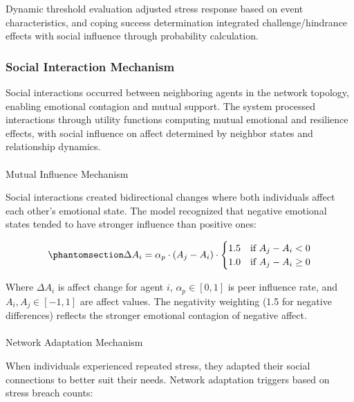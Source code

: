 \documentclass[
  letterpaper,
  DIV=11,
  numbers=noendperiod]{scrartcl}
\makeatletter
\let\oldparagraph\paragraph
\renewcommand{\paragraph}{
    \@ifstar
      \xxxParagraphStar
      \xxxParagraphNoStar
  }
\newcommand{\xxxParagraphStar}[1]{\oldparagraph*{#1}\mbox{}}
\newcommand{\xxxParagraphNoStar}[1]{\oldparagraph{#1}\mbox{}}
\makeatother
\begin{document}
Dynamic threshold evaluation adjusted stress response based on event
characteristics, and coping success determination integrated
challenge/hindrance effects with social influence through probability
calculation.

\subsubsection{Social Interaction
Mechanism}\label{social-interaction-mechanism}

Social interactions occurred between neighboring agents in the network
topology, enabling emotional contagion and mutual support. The system
processed interactions through utility functions computing mutual
emotional and resilience effects, with social influence on affect
determined by neighbor states and relationship dynamics.

\paragraph{Mutual Influence Mechanism}\label{mutual-influence-mechanism}

Social interactions created bidirectional changes where both individuals
affect each other's emotional state. The model recognized that negative
emotional states tended to have stronger influence than positive ones:

\begin{equation}\phantomsection\label{eq-mutual-influence}{
\Delta A_i = \alpha_p \cdot (A_j - A_i) \cdot \begin{cases}
1.5 & \text{if } A_j - A_i < 0 \\
1.0 & \text{if } A_j - A_i \geq 0
\end{cases}
}\end{equation}

Where \(\Delta A_i\) is affect change for agent \(i\),
\(\alpha_p \in [0,1]\) is peer influence rate, and
\(A_i, A_j \in [-1,1]\) are affect values. The negativity weighting (1.5
for negative differences) reflects the stronger emotional contagion of
negative affect.

\paragraph{Network Adaptation
Mechanism}\label{network-adaptation-mechanism}

When individuals experienced repeated stress, they adapted their social
connections to better suit their needs. Network adaptation triggers
based on stress breach counts:
\end{document}
